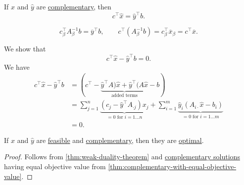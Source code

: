 \begin{theorem}\label{thm:complementary-with-equal-objective-value}
	If \(\hat{x}\) and \(\hat{y}\) are \hyperref[def:complementary]{complementary}, then
	\[
		c^{\top}\hat{x} = \hat{y}^{\top} b.
	\]
\end{theorem}
\begin{note}
	\[
		c^{\top}_{\beta} A^{-1}_{\beta}b = \overline{y}^{\top} b,\qquad c^{\top}(A^{-1}_{\beta} b) = c^{\top}_{\beta}\overline{x}_{\beta} = c^{\top}\overline{x}.
	\]
\end{note}
\begin{explanation}
	We show that
	\[
		c^{\top} \hat{x} - \hat{y}^{\top} b = 0.
	\]
	We have
	\[
		\begin{split}
			c^{\top} \hat{x} - \hat{y}^{\top} b &= (c^{\top} - \underbrace{\hat{y}^{\top}A)\hat{x} + \hat{y}^{\top}(A \hat{x}}_{\text{added terms}} - b)\\
			&=\sum\limits_{j=1}^{n} \underbrace{(c_{j}-\hat{y}^{\top}A_{\cdot j})x_{j}}_{ = 0\text{ for }i = 1\ldots n}
			+ \sum\limits_{i=1}^{m} \underbrace{\hat{y}_i(A_{i\cdot}\hat{x} - b_{i})}_{ = 0\text{ for }i = 1\ldots m}\\
			&= 0.
		\end{split}
	\]
\end{explanation}

\begin{theorem}\label{thm:weak-complementary-slackness-theorem}
	If \(\hat{x}\) and \(\hat{y}\) are \hyperref[def:feasible-solution]{feasible} and \hyperref[def:complementary]{complementary}, then they are \hyperref[def:optimal-solution]{optimal}.
\end{theorem}
\begin{proof}
	Follows from \autoref{thm:weak-duality-theorem} and \hyperref[def:complementary]{complementary solutions} having equal objective value from \autoref{thm:complementary-with-equal-objective-value}.
\end{proof}

